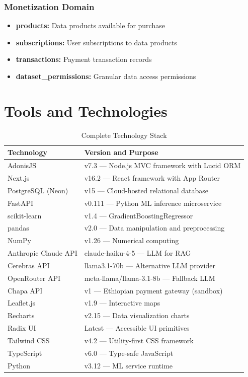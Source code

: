 \subsubsection{Monetization Domain}
\begin{itemize}
  \item \textbf{products:} Data products available for purchase
  \item \textbf{subscriptions:} User subscriptions to data products
  \item \textbf{transactions:} Payment transaction records
  \item \textbf{dataset\_permissions:} Granular data access permissions
\end{itemize}

\section{Tools and Technologies}

\begin{table}[H]
\centering
\caption{Complete Technology Stack}
\label{tab:full-tech-stack}
\begin{tabularx}{\textwidth}{lX}
\toprule
\textbf{Technology} & \textbf{Version and Purpose} \\
\midrule
AdonisJS & v7.3 — Node.js MVC framework with Lucid ORM \\
Next.js & v16.2 — React framework with App Router \\
PostgreSQL (Neon) & v15 — Cloud-hosted relational database \\
FastAPI & v0.111 — Python ML inference microservice \\
scikit-learn & v1.4 — GradientBoostingRegressor \\
pandas & v2.0 — Data manipulation and preprocessing \\
NumPy & v1.26 — Numerical computing \\
Anthropic Claude API & claude-haiku-4-5 — LLM for RAG \\
Cerebras API & llama3.1-70b — Alternative LLM provider \\
OpenRouter API & meta-llama/llama-3.1-8b — Fallback LLM \\
Chapa API & v1 — Ethiopian payment gateway (sandbox) \\
Leaflet.js & v1.9 — Interactive maps \\
Recharts & v2.15 — Data visualization charts \\
Radix UI & Latest — Accessible UI primitives \\
Tailwind CSS & v4.2 — Utility-first CSS framework \\
TypeScript & v6.0 — Type-safe JavaScript \\
Python & v3.12 — ML service runtime \\
\bottomrule
\end{tabularx}
\end{table}
